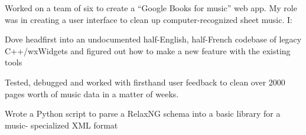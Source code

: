 \documentclass[letterpaper]{deedy-resume}
\begin{document}
\begin{minipage}[t]{0.66\textwidth}
Worked on a team of six to create a “Google Books for music” web app. My role was in
creating a user interface to clean up computer-recognized sheet music. I:
\begin{tightitemize}
\item Dove headfirst into an undocumented half-English, half-French codebase of legacy
C++/wxWidgets and figured out how to make a new feature with the existing tools
\item Tested, debugged and worked with firsthand user feedback to clean over 2000
pages worth of music data in a matter of weeks.
\item Wrote a Python script to parse a RelaxNG schema into a basic library for a music-
specialized XML format
\end{tightitemize}

\sectionspace

\end{minipage}
\end{document}
